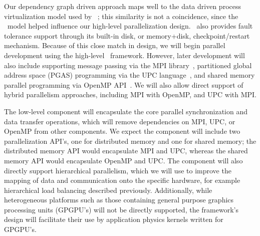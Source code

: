 \documentclass[11pt,letterpaper]{article}
\begin{document}

% 

%
Our dependency graph driven approach maps well to the data driven process
virtualization model used by \charm~\cite{KaKr96,KaBo07,wwwcharm};
this similarity is not a coincidence, since the \charm\ model helped
influence our high-level parallelization design.  \charm\ also
provides fault tolerance support through its built-in disk, or
memory+disk, checkpoint/restart mechanism.  Because of this close
match in design, we will begin parallel development using the
high-level \charm\ framework.
However, later development will also
include supporting message passing via the MPI library~\cite{wwwmpi},
partitioned global address space (PGAS) programming via the UPC
language~\cite{upc,wwwupc}, and shared memory parallel
programming via OpenMP API~\cite{wwwopenmp}.  We will also allow
direct support of hybrid parallelism approaches, including MPI with
OpenMP, and UPC with MPI.

The low-level  component will encapsulate the core
parallel synchronization and data transfer operations, which will
remove dependencies on MPI, UPC, or OpenMP from other components.  We
expect the  component will include two parallelization
API's, one for distributed memory and one for shared memory; the
distributed memory API would encapsulate MPI and UPC, whereas the
shared memory API would encapsulate OpenMP and UPC.  The
 component will also directly support hierarchical
parallelism, which we will use to improve the mapping of data and
communication onto the specific hardware, for example hierarchical
load balancing described previously.  Additionally, while
heterogeneous platforms such as those containing general purpose
graphics processing units (GPGPU's) will not be directly supported,
the framework's design will facilitate their use by application
physics kernels written for GPGPU's.
\end{document}
